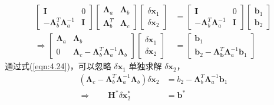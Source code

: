 \begin{equation}
\label{eqn:4.24}
\begin{aligned}
\left[ \begin{array}{cc}
{ \mathbf{I}} & {0} \\ 
{-\bm{\Lambda}_{b}^{T} \bm{\Lambda}_{a}^{-1}} & {\mathbf{I}}
\end{array}\right] 
\left[ \begin{array}{cc}
{\bm{\Lambda}_{a}} & {\bm{\Lambda}_{b}} \\ 
{\bm{\Lambda}_{b}^{T}} & {\bm{\Lambda}_{c}}
\end{array}\right] 
\left[ \begin{array}{c}
{\delta \mathbf{x}_{1}} \\ {\delta \mathbf{x}_{2}}
\end{array}\right]
&=
\left[ \begin{array}{cc}
{\mathbf{I}} & {0} \\ 
{-\bm{\Lambda}_{b}^{T} \bm{\Lambda}_{a}^{-1}} & {\mathbf{I}}
\end{array}\right] 
\left[ \begin{array}
{l}{\mathbf{b}_{1}} \\ {\mathbf{b}_{2}}
\end{array}\right] \\
\Longrightarrow
\left[ \begin{array}{cc}
{\bm{\Lambda}_{a}} & {\bm{\Lambda}_{b}} \\ 
{0} & {\bm{\Lambda}_{c}-\bm{\Lambda}_{b}^{T} \bm{\Lambda}_{a}^{-1} \bm{\Lambda}_{b}}
\end{array}\right] 
\left[ \begin{array}{l}
{\delta \mathbf{x}_{1}} \\ {\delta \mathbf{x}_{2}}
\end{array}\right]
&=
\left[ \begin{array}{c}
{\mathbf{b}_{1}} \\ {\mathbf{b}_{2}-\bm{\Lambda}_{\mathbf{b}}^{T} \bm{\Lambda}_{a}^{-1} \mathbf{b}_{1}}
\end{array}\right]
\end{aligned}
\end{equation}
通过式(\ref{eqn:4.24})，可以忽略 $\delta \mathbf{x}_1$ 单独求解 $\delta \mathbf{x}_2$，
\begin{equation}
\label{eqn:4.25}
\begin{aligned}
\left( \bm{\Lambda}_{c}-\bm{\Lambda}_{b}^{T} \bm{\Lambda}_{a}^{-1} \bm{\Lambda}_{b}\right) \delta \mathbf{x}_{2} &= 
b_{2}- \bm{\Lambda}_{b}^{T} \bm{\Lambda}_{a}^{-1} \mathbf{b}_{1} \\
\Longrightarrow  \quad \quad
\mathbf{H}^{*} \delta \mathbf{x}_{2}^{*}&= \mathbf{b}^{*}
\end{aligned}
\end{equation}
